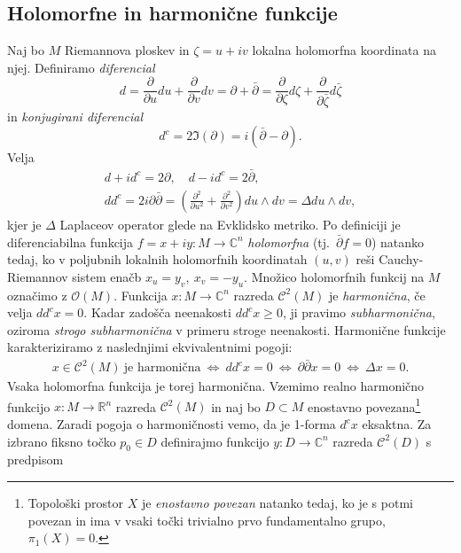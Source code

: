 \documentclass[12pt,a4paper,twoside]{article}
\theoremstyle{definition} %
\theoremstyle{plain} %
\numberwithin{equation}{section}  %
\begin{document}
\subsection{Holomorfne in harmonične funkcije}
%
Naj bo $M$ Riemannova ploskev in $\zeta = u+iv$ lokalna holomorfna koordinata na njej. 
Definiramo \emph{diferencial} 
\begin{equation}
d = \frac{\partial}{\partial u}du + \frac{\partial}{\partial v}dv = \partial + \bar{\partial} = \frac{\partial}{\partial \zeta}d\zeta + \frac{\partial}{\partial \bar{\zeta}}d\bar{\zeta}
\end{equation}
in \emph{konjugirani diferencial}
\begin{equation}
d^{c} = 2 \Im(\partial) = i(\bar{\partial} - \partial).
\end{equation}
Velja
\begin{gather*}
d + id^{c} = 2\partial , \quad  d - id^{c} = 2\bar{\partial}, \\
dd^{c} = 2i\partial \bar{\partial} = \left( \frac{\partial^2}{\partial u^2} + \frac{\partial^2}{\partial v^2} \right) du \wedge dv = \Delta du \wedge dv,
\end{gather*}
kjer je $\Delta$ Laplaceov operator glede na Evklidsko metriko.\newline
%
Po definiciji je diferenciabilna funkcija $f = x + iy \colon M \to \mathbb{C}^{n}$ \emph{holomorfna} (tj.~$\bar{\partial}f = 0$) natanko tedaj, ko v poljubnih lokalnih holomorfnih koordinatah $(u,v)$ reši Cauchy-Riemannov sistem enačb $x_{u}=y_{v}, \ x_{v}=-y_{u}$. Množico holomorfnih funkcij na $M$ označimo z $\mathcal{O}(M)$. \newline
%
Funkcija $x \colon M \to \mathbb{C}^{n}$ razreda $\mathcal{C}^2(M)$ je \emph{harmonična}, če velja $dd^{c}x=0$.
Kadar zadošča neenakosti $dd^{c}x \geq 0$, ji pravimo \emph{subharmonična}, oziroma \emph{strogo subharmonična} v primeru stroge neenakosti.
Harmonične funkcije karakteriziramo z naslednjimi ekvivalentnimi pogoji:
\begin{gather*}
x \in \mathcal{C}^2(M) \ \text{je harmonična} \ \iff \ dd^{c}x=0 \ \iff \ \partial \bar{\partial}x=0 \ \iff \ \Delta x=0.
\end{gather*}
Vsaka holomorfna funkcija je torej harmonična. 
Vzemimo realno harmonično funkcijo $x \colon M \to \mathbb{R}^{n}$ razreda $\mathcal{C}^2(M)$ in naj bo $D \subset M$ enostavno povezana\footnote{Topološki prostor $X$ je \emph{enostavno povezan} natanko tedaj, ko je s potmi povezan in ima v vsaki točki trivialno prvo fundamentalno grupo, $\pi_{1}(X)=0$.} domena. Zaradi pogoja o harmoničnosti vemo, da je 1-forma $d^{c}x$ eksaktna. Za izbrano fiksno točko $p_{0} \in D$ definirajmo funkcijo $y \colon D \to \mathbb{C}^{n}$ razreda $\mathcal{C}^2(D)$ s predpisom
\end{document}
